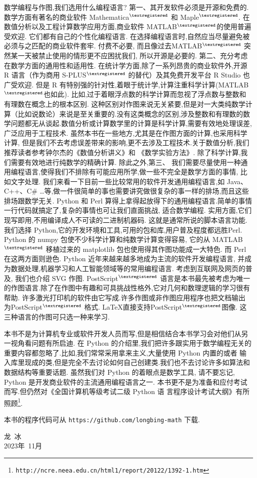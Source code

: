 数学编程与作图,我们选用什么编程语言?
第一、其开发软件必须是开源和免费的.
数学方面有著名的商业软件 Mathematica${}^{\textregistered}$ 和 Maple${}^{\textregistered}$.
在数值分析以及工程计算数学应用方面,商业软件 MATLAB${}^{\textregistered}$的使用普遍受欢迎.
它们都有自己的个性化编程语言.
在选择编程语言时,自然应当尽量避免被必须与之匹配的商业软件套牢.
付费不必要, 而且像过去MATLAB${}^{\textregistered}$ 突然某一天被禁止使用的情形更不应困扰我们, 所以开源是必要的.
第二、充分考虑在数学方面的通用性和适用性.
在统计学方面,除了一系列昂贵的商业软件外,开源 R 语言（作为商用 S-PLUS${}^{\textregistered}$ 的替代）及其免费开发平台 R Studio 也广受欢迎.
但是 R 有特别强的针对性,着眼于统计学,计算注重科学计算(MATLAB${}^{\textregistered}$也如此).
比如,过于着眼浮点数的科学计算而忽视了浮点数与整数和有理数在概念上的根本区别.
这种区别对作图来说无关紧要,但是对一大类纯数学计算（比如说数论）来说是至关重要的.没有这类概念的区别,涉及整数和有理数的数学问题都无从谈起.数值分析或计算数学里的计算是科学计算,需要有效地处理误差,广泛应用于工程技术.
虽然本书在一些地方,尤其是在作图方面的计算,也采用科学计算,
但是我们不去考虑误差带来的影响,更不去涉及工程技术.关于数值分析,我们推荐读者参考钟尔杰的《数值分析讲义》\cite{ZhongEr1}和
《数学实验方法》\cite{ZhongEr2}.
除了科学计算,我们需要有效地进行纯数学的精确计算.
除此之外,第三、
我们需要尽量使用一种通用编程语言,使得我们不排除有可能应用所学,做一些不完全是数学方面的事情, 比如文字处理.
我们来看一下目前一些比较常用的软件开发通用编程语言,如 Java、C++、C\# …等,做一件很简单的事也需要讲究做很复杂的事一样的排场,而且这些排场跟数学无关. 
Python 和 Perl 算得上拿得起放得下的通用编程语言.简单的事情一行代码就搞定了,复杂的事情也可让我们直面挑战, 适合数学编程.
实用方面,它们现写即用,不用编译成人不可读的二进制机器码.
这就是通常所说的脚本语言功能.
我们选择 Python,它的开发环境和工具,可用的包和库,用户普及程度都远胜Perl. Python 的 numpy 包使不少科学计算和纯数学计算变得容易, 它的从 MATLAB${}^{\textregistered}$ 移植过来的 matplotlib 包也使用得其作图功能成一大特色. 而 Perl 在这两方面则逊色. 
Python 近年来越来越多地成为主流的软件开发编程语言,
并成为数据处理,机器学习和人工智能领域等的常用编程语言.
考虑到互联网及网页的普及, 我们也介绍 SVG 作图. PostScript${}^{\textregistered}$ 语言是本书最先被考虑为唯一的作图语言.除了在作图中有趣和可具挑战性格外,它对几何和数理逻辑的学习很有帮助.
许多激光打印机的软件由它写成.许多作图或非作图应用程序也把文档输出
为PostScript${}^{\textregistered}$ 格式. \LaTeX 直接支持PostScript${}^{\textregistered}$图像.
这三种语言的作图可只选一种来学习.

本书不是为计算机专业或软件开发人员而写,但是相信结合本书学习会对他们从另一视角看问题有所启迪.
在 Python 的介绍里,我们把许多跟实用于数学编程无关的重要内容都忽略了.比如,我们常常采用拿来主义,大量使用 Python 内置的或者
输入库里现成的类,但是完全不去讨论如何自己创建类.我们也不去讨论许多如算法和数据结构等重要话题. 虽然我们对 Python 的着眼点是数学工具,
请不要忘记, Python 是开发商业软件的主流通用编程语言之一.
本书更不是为准备和应付考试而写.但仍然对《全国计算机等级考试二级 Python 语 言程序设计考试大纲》有所照顾\footnote{\texttt{http://ncre.neea.edu.cn/html1/report/20122/1392-1.htm}}.

本书的程序代码可从 \verb|https://github.com/longbing-math| 下载.



{\kaishu
	\begin{center}
		\hspace*{88mm}龙\,   冰\\
		\hspace*{88mm}2023年~11月
	\end{center}
}


